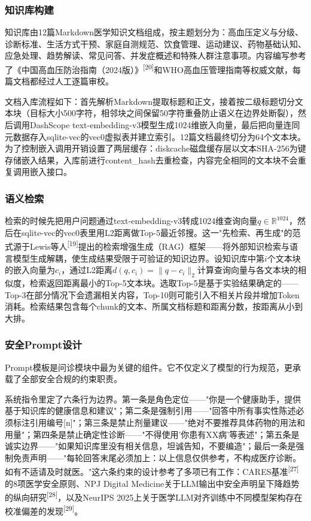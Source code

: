 \documentclass[zihao=-4,a4paper]{ctexart}
\begin{document}
\subsubsection{知识库构建}

知识库由12篇Markdown医学知识文档组成，按主题划分为：高血压定义与分级、诊断标准、生活方式干预、家庭自测规范、饮食管理、运动建议、药物基础认知、应急处理、趋势解读、常见问答、并发症概述和特殊人群注意事项。内容编写参考了《中国高血压防治指南（2024版）》\textsuperscript{[20]}和WHO高血压管理指南等权威文献，每篇文档都经过人工逐篇审校。

文档入库流程如下：首先解析Markdown提取标题和正文，接着按二级标题切分文本块（目标大小500字符，相邻块之间保留50字符重叠防止语义在边界处断裂），然后调用DashScope text-embedding-v3模型生成1024维嵌入向量，最后把向量连同元数据存入sqlite-vec的vec0虚拟表并建立索引。12篇文档最终切分为64个文本块。为了控制嵌入调用开销设置了两层缓存：diskcache磁盘缓存层以文本SHA-256为键存储嵌入结果，入库前进行content\_hash去重检查，内容完全相同的文本块不会重复调用嵌入接口。

\subsubsection{语义检索}

检索的时候先把用户问题通过text-embedding-v3转成1024维查询向量$q \in \mathbb{R}^{1024}$，然后在sqlite-vec的vec0表里用L2距离做Top-5最近邻搜。这一"先检索、再生成"的范式源于Lewis等人\textsuperscript{[19]}提出的检索增强生成（RAG）框架——将外部知识检索与语言模型生成解耦，使生成结果受限于可验证的知识边界。设知识库中第$i$个文本块的嵌入向量为$c_i$，通过L2距离$d(q, c_i) = \|q - c_i\|_2$计算查询向量与各文本块的相似度，检索返回距离最小的Top-5文本块。选取Top-5是基于实验结果确定的——Top-3在部分情况下会遗漏相关内容，Top-10则可能引入不相关片段并增加Token消耗。检索结果包含每个chunk的文本、所属文档标题和距离分数，按距离从小到大排。

\subsubsection{安全Prompt设计}

Prompt模板是问诊模块中最为关键的组件。它不仅定义了模型的行为规范，更承载了全部安全合规的约束职责。

系统指令里定了六条行为边界。第一条是角色定位——"你是一个健康助手，提供基于知识库的健康信息和建议"；第二条是强制引用——"回答中所有事实性陈述必须标注引用编号[n]"；第三条是禁止剂量建议——"绝对不要推荐具体药物的用法和用量"；第四条是禁止确定性诊断——"不得使用'你患有XX病'等表述"；第五条是诚实边界——"如果知识库里没有相关信息，坦诚告知，不要编造"；最后一条是强制免责声明——"每轮回答末尾必须加上：以上信息仅供参考，不构成医疗诊断。如有不适请及时就医。"这六条约束的设计参考了多项已有工作：CARES基准\textsuperscript{[27]}的8项医学安全原则、NPJ Digital Medicine关于LLM输出中安全声明呈下降趋势的纵向研究\textsuperscript{[28]}，以及NeurIPS 2025上关于医学LLM对齐训练中不同模型架构存在校准偏差的发现\textsuperscript{[29]}。
\end{document}
